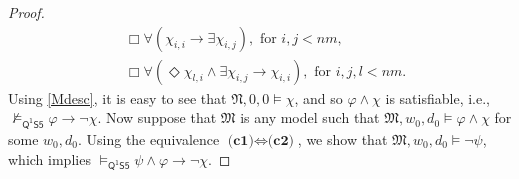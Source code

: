 \documentclass{lmcs} %
\theoremstyle{plain}\newtheorem{satz}[thm]{Satz} %
\newcommand{\FOMS}{\ensuremath{\mathsf{Q^1S5}}}
\newcommand{\fform}[1]{\boldsymbol{#1}}
\newcommand{\gvar}{\fform{g}}
\newcommand{\Bv}{\forall}
\newcommand{\Bh}{\Box}
\newcommand{\Dv}{\exists}
\newcommand{\Dh}{\Diamond}
\begin{document}
\begin{proof}
\begin{align}
		&\Box \forall(\chi_{i,i} \rightarrow \Dv \chi_{i,j}), \text{ for $i,j<nm$},\\
		\label{sol}
		&\Bh\Bv(\Dh \chi_{l,i} \wedge \Dv \chi_{i,j} \rightarrow \chi_{i,i}), \text{ for $i,j,l <nm$}.
	\end{align}
	Using \eqref{Mdesc}, it is easy to see that
	$\mathfrak{N},0,0\models \chi$, and so $\varphi \wedge \chi$ is satisfiable, i.e., $\not\models_\FOMS\varphi\to \neg\chi$. 
	Now suppose that $\mathfrak{M}$ is any model such that $\mathfrak{M},w_0,d_0 \models \varphi\wedge\chi$ for some $w_0,d_0$. Using the 
	equivalence $\textbf{(c1)} \Leftrightarrow \textbf{(c2)}$, we show that $\mathfrak{M},w_0,d_0 \models\neg\psi$, which implies $\models_\FOMS \psi\land \varphi \to \neg\chi$. 
	

\end{proof}
\end{document}
